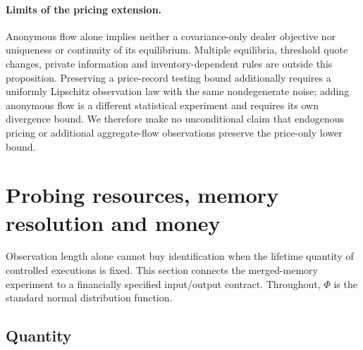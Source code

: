 \documentclass[12pt]{article}
\theoremstyle{definition}
\theoremstyle{remark}
\begin{document}
\paragraph{Limits of the pricing extension.} Anonymous flow alone implies neither a covariance-only dealer objective nor uniqueness or continuity of its equilibrium. Multiple equilibria, threshold quote changes, private information and inventory-dependent rules are outside this proposition. Preserving a price-record testing bound additionally requires a uniformly Lipschitz observation law with the same nondegenerate noise; adding anonymous flow is a different statistical experiment and requires its own divergence bound. We therefore make no unconditional claim that endogenous pricing or additional aggregate-flow observations preserve the price-only lower bound.

\section{Probing resources, memory resolution and money}\label{sec:resources}

Observation length alone cannot buy identification when the lifetime quantity of controlled executions is fixed. This section connects the merged-memory experiment to a financially specified input/output contract. Throughout, $\Phi$ is the standard normal distribution function.

\subsection{Quantity}
\end{document}
